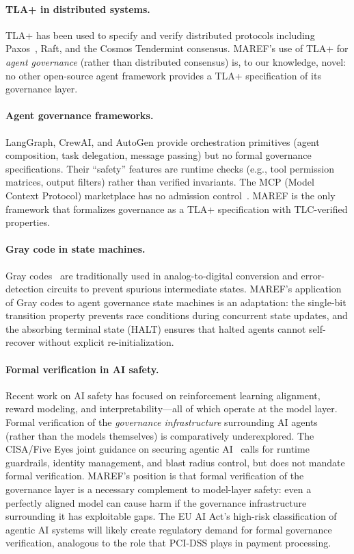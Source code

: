 \documentclass[11pt]{article}
\begin{document}
\paragraph{TLA+ in distributed systems.} TLA+ has been used to specify and
verify distributed protocols including Paxos~\cite{lamport-paxos}, Raft, and
the Cosmos Tendermint consensus. MAREF's use of TLA+ for \emph{agent
governance} (rather than distributed consensus) is, to our knowledge, novel:
no other open-source agent framework provides a TLA+ specification of its
governance layer.

\paragraph{Agent governance frameworks.} LangGraph, CrewAI, and AutoGen
provide orchestration primitives (agent composition, task delegation,
message passing) but no formal governance specifications. Their ``safety''
features are runtime checks (e.g., tool permission matrices, output filters)
rather than verified invariants. The MCP (Model Context Protocol) marketplace
has no admission control~\cite{maref-w7}. MAREF is the only framework that
formalizes governance as a TLA+ specification with TLC-verified properties.

\paragraph{Gray code in state machines.} Gray codes~\cite{gray-patent} are
traditionally used in analog-to-digital conversion and error-detection
circuits to prevent spurious intermediate states. MAREF's application of Gray
codes to agent governance state machines is an adaptation: the single-bit
transition property prevents race conditions during concurrent state updates,
and the absorbing terminal state (HALT) ensures that halted agents cannot
self-recover without explicit re-initialization.

\paragraph{Formal verification in AI safety.} Recent work on AI safety has
focused on reinforcement learning alignment, reward modeling, and
interpretability---all of which operate at the model layer. Formal
verification of the \emph{governance infrastructure} surrounding AI agents
(rather than the models themselves) is comparatively underexplored. The
CISA/Five Eyes joint guidance on securing agentic AI~\cite{cisa-five-eyes}
calls for runtime guardrails, identity management, and blast radius control,
but does not mandate formal verification. MAREF's position is that formal
verification of the governance layer is a necessary complement to model-layer
safety: even a perfectly aligned model can cause harm if the governance
infrastructure surrounding it has exploitable gaps. The EU AI Act's
high-risk classification of agentic AI systems will likely create regulatory
demand for formal governance verification, analogous to the role that
PCI-DSS plays in payment processing.
\end{document}
